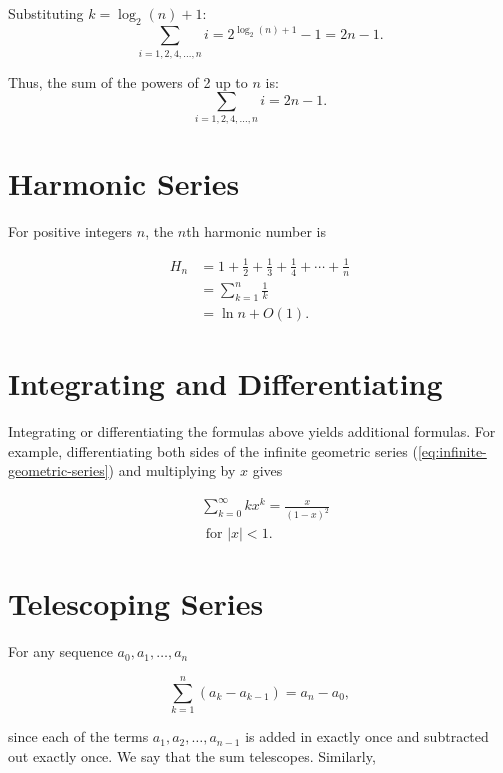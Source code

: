         Substituting \(k = \log_2(n) + 1\):
        \[
            \sum_{i=1,2,4,\ldots,n} i = 2^{\log_2(n)+1} - 1 = 2n - 1.
        \]
        
        Thus, the sum of the powers of 2 up to \(n\) is:
        \[
            \sum_{i=1,2,4,\ldots,n} i = 2n - 1.
        \]
        

\section*{Harmonic Series}
For positive integers $n$, the $n$th harmonic number is

\begin{align}
    H_n & = 1 + \frac{1}{2} + \frac{1}{3} + \frac{1}{4} + \cdots + \frac{1}{n} \nonumber \\
        & = \sum_{k=1}^n \frac{1}{k} \label{eq:harmonic_sum} \\
        & = \ln n + O(1) . \label{eq:approximation}
\end{align}

\section*{Integrating and Differentiating}
Integrating or differentiating the formulas above yields additional formulas. For example, differentiating both sides of the infinite geometric series (\ref{eq:infinite-geometric-series}) and multiplying by $x$ gives


\begin{equation}
    \begin{aligned}
    & \sum_{k=0}^{\infty} k x^k=\frac{x}{(1-x)^2} \\ 
    & \text { for }|x|<1 . \label{eq:diff-geometric-series}
    \end{aligned}
\end{equation}

\section*{Telescoping Series}

For any sequence $a_0, a_1, \ldots, a_n$

\begin{equation}
    \sum_{k=1}^n\left(a_k-a_{k-1}\right)=a_n-a_0, \label{eq:telescoping-series}
\end{equation}

since each of the terms $a_1, a_2, \ldots, a_{n-1}$ is added in exactly once and subtracted out exactly once. We say that the sum telescopes. Similarly,

